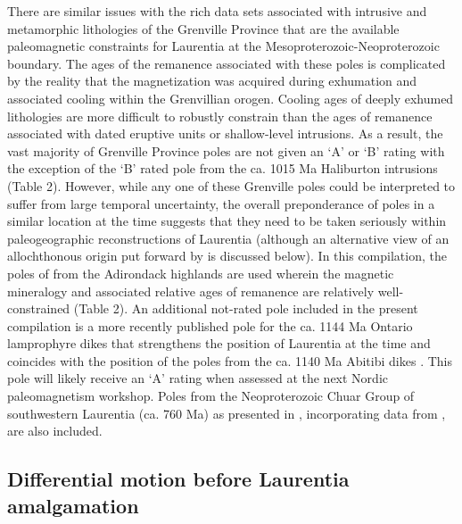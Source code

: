 \documentclass[twocolumn, switch]{article} %
\begin{document}
There are similar issues with the rich data sets associated with intrusive and metamorphic lithologies of the Grenville Province that are the available paleomagnetic constraints for Laurentia at the Mesoproterozoic-Neoproterozoic boundary. The ages of the remanence associated with these poles is complicated by the reality that the magnetization was acquired during exhumation and associated cooling within the Grenvillian orogen. Cooling ages of deeply exhumed lithologies are more difficult to robustly constrain than the ages of remanence associated with dated eruptive units or shallow-level intrusions. As a result, the vast majority of Grenville Province poles are not given an `A' or `B' rating with the exception of the `B' rated pole from the ca. 1015 Ma Haliburton intrusions (Table 2). However, while any one of these Grenville poles could be interpreted to suffer from large temporal uncertainty, the overall preponderance of poles in a similar location at the time suggests that they need to be taken seriously within paleogeographic reconstructions of Laurentia (although an alternative view of an allochthonous origin put forward by \citealp{Halls2015a} is discussed below). In this compilation, the poles of \cite{Brown2012a} from the Adirondack highlands are used wherein the magnetic mineralogy and associated relative ages of remanence are relatively well-constrained (Table 2). An additional not-rated pole included in the present compilation is a more recently published pole for the ca. 1144 Ma Ontario lamprophyre dikes \citep{Piispa2018a} that strengthens the position of Laurentia at the time and coincides with the position of the poles from the ca. 1140 Ma Abitibi dikes \citep{Ernst1993a}. This pole will likely receive an `A' rating when assessed at the next Nordic paleomagnetism workshop. Poles from the Neoproterozoic Chuar Group of southwestern Laurentia (ca. 760 Ma)  as presented in \cite{Eyster2020a}, incorporating data from \cite{Weil2004a}, are also included. 

\subsection{Differential motion before Laurentia amalgamation}
\end{document}
